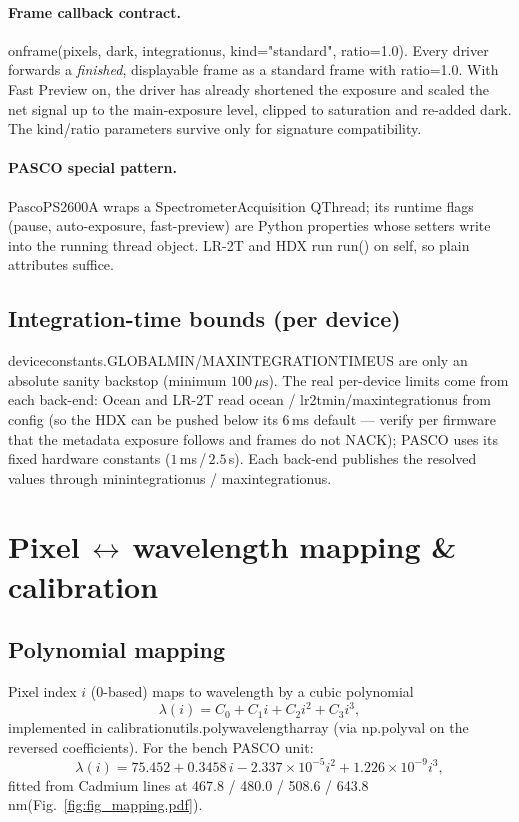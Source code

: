 \documentclass[12pt,a4paper]{article}
\DeclareRobustCommand{\code}[1]{{\ttfamily\small\def\_{\rawus\allowbreak}#1}}
\DeclareRobustCommand{\key}[1]{{\ttfamily\small\color{acc2}\def\_{\rawus\allowbreak}#1}}
\newcommand{\nm}{\,nm}
\newcommand{\um}{\ensuremath{\mu\mathrm{s}}}
\begin{document}
\paragraph{Frame callback contract.}
\code{on\_frame(pixels, dark, integration\_us, kind="standard", ratio=1.0)}. Every
driver forwards a \emph{finished}, displayable frame as a standard frame with
\code{ratio=1.0}. With Fast Preview on, the driver has already shortened the
exposure and scaled the net signal up to the main-exposure level, clipped to
saturation and re-added dark. The \code{kind}/\code{ratio} parameters survive only
for signature compatibility.

\paragraph{PASCO special pattern.}
\code{PascoPS2600A} wraps a \code{SpectrometerAcquisition} \code{QThread}; its
runtime flags (pause, auto-exposure, fast-preview) are Python properties whose
setters write into the running thread object. LR-2T and HDX run \code{\_run()} on
\code{self}, so plain attributes suffice.

\subsection{Integration-time bounds (per device)}
\code{device\_constants.GLOBAL\_MIN/MAX\_INTEGRATION\_TIME\_US} are only an absolute
sanity backstop (minimum $100\,\um$). The real per-device limits come from each
back-end: Ocean and LR-2T read \key{ocean\_*} / \key{lr2t\_min/max\_integration\_us}
from config (so the HDX can be pushed below its $6\,$ms default --- verify per
firmware that the metadata exposure follows and frames do not NACK); PASCO uses its
fixed hardware constants ($1\,$ms\,/\,$2.5\,$s). Each back-end publishes the
resolved values through \code{min\_integration\_us} / \code{max\_integration\_us}.

\section{Pixel\,$\leftrightarrow$\,wavelength mapping \& calibration}
\subsection{Polynomial mapping}
Pixel index $i$ (0-based) maps to wavelength by a cubic polynomial
\[
\lambda(i) = C_0 + C_1 i + C_2 i^2 + C_3 i^3 ,
\]
implemented in \code{calibration\_utils.poly\_wavelength\_array}
(via \code{np.polyval} on the reversed coefficients). For the bench PASCO unit:
\[
\lambda(i) = 75.452 + 0.3458\,i - 2.337\times10^{-5} i^2 + 1.226\times10^{-9} i^3 ,
\]
fitted from Cadmium lines at 467.8 / 480.0 / 508.6 / 643.8\nm (Fig.~\ref{fig:fig_mapping.pdf}).
\end{document}
